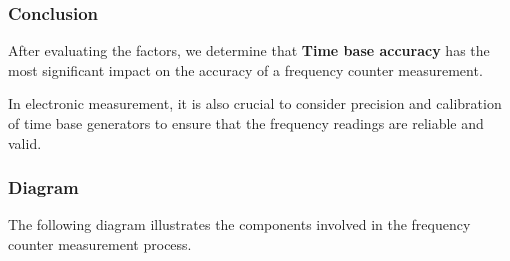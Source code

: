 \subsubsection{Conclusion}

After evaluating the factors, we determine that \textbf{Time base accuracy} has the most significant impact on the accuracy of a frequency counter measurement. 

In electronic measurement, it is also crucial to consider precision and calibration of time base generators to ensure that the frequency readings are reliable and valid.

\subsubsection{Diagram}

The following diagram illustrates the components involved in the frequency counter measurement process.

